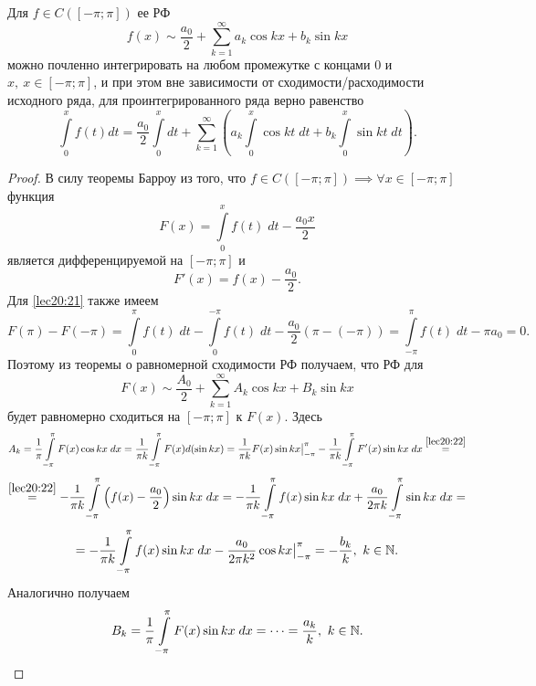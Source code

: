 \documentclass[../../main.tex]{subfiles}
\begin{document}
	\begin{thm}
		Для $ f \in C([-\pi; \pi]) $ ее РФ \[ f(x) \sim
		\dfrac{a_0}{2} + \sum\limits_{k = 1}^\infty 
		a_k\cos kx + b_k\sin kx \] можно почленно интегрировать 
		на любом промежутке с концами $ 0 $ и $ x,\ x \in [-\pi; \pi] $, 
		и при этом вне зависимости от сходимости/расходимости 
		исходного ряда, для проинтегрированного ряда верно равенство
		\begin{equation}
		\label{lec20:20}
		\int\limits_0^x f(t) dt = \dfrac{a_0}{2} \int\limits_0^x
		dt + \sum\limits_{k = 1}^\infty \left(
		a_k \int\limits_0^x \cos kt\; dt + 
		b_k \int\limits_0^x \sin kt\; dt
		\right).
		\end{equation}
	\end{thm}
	\begin{proof}
		В силу теоремы Барроу из того, что $ f \in C([-\pi; \pi]) \implies 
		\forall x \in [-\pi; \pi]$ функция  
		\begin{equation}
		\label{lec20:21}
		F(x) = 
		\int\limits_0^x f(t)\;dt - \dfrac{a_0x}{2} 
		\end{equation}
		является дифференцируемой на $ [-\pi; \pi] $ и 
		\begin{equation}
		\label{lec20:22}
		F'(x) = f(x) - \dfrac{a_0}{2}.
		\end{equation}
		Для \eqref{lec20:21} также имеем \[
		F(\pi) - F(-\pi) = \int\limits_0^\pi f(t)\;dt - 
		\int\limits_0^{-\pi} f(t)\;dt - \dfrac{a_0}{2}(\pi - (-\pi)) =
		\int\limits_{-\pi}^\pi f(t)\;dt - \pi a_0 = 0.
		\]
		Поэтому из теоремы о равномерной сходимости РФ получаем, что РФ для 
		\[F(x) \sim \dfrac{A_0}{2} + 
		\sum\limits_{k = 1}^\infty A_k\cos kx + B_k\sin kx\]
		будет равномерно сходиться на $ [-\pi; \pi] $ к $ F(x) $.
		Здесь \[ A_k = \dfrac{1}{\pi} \int\limits_{-\pi}^\pi F(x) \cos kx\;dx = 
		\dfrac{1}{\pi k} \int\limits_{-\pi}^\pi F(x) d(\sin kx) =
		\dfrac{1}{\pi k} F(x) \sin kx \big|_{-\pi}^\pi - 
		\dfrac{1}{\pi k} \int\limits_{-\pi}^\pi F'(x)\sin kx\;dx 
		\stackrel{\eqref{lec20:22}}{=} \] \[
		\stackrel{\eqref{lec20:22}}{=}
		-\dfrac{1}{\pi k} \int\limits_{-\pi}^\pi \left(
		f(x) - \dfrac{a_0}{2} \right) \sin kx\;dx =
		-\dfrac{1}{\pi k} \int\limits_{-\pi}^\pi f(x) \sin kx\;dx + 
		\dfrac{a_0}{2\pi k} \int\limits_{-\pi}^\pi \sin kx\;dx = \] \[ =
		-\dfrac{1}{\pi k} \int\limits_{-\pi}^\pi f(x) \sin kx\;dx - 
		\dfrac{a_0}{2\pi k^2} \cos kx \big|_{-\pi}^\pi = 
		-\dfrac{b_k}{k},\ k \in \mathbb{N}.
		\]
		Аналогично получаем \[ 
		B_k = \dfrac{1}{\pi} \int\limits_{-\pi}^\pi F(x) \sin kx\;dx = \dots =
		\dfrac{a_k}{k},\ k \in \mathbb{N}.
\]
\end{proof}
\end{document}
